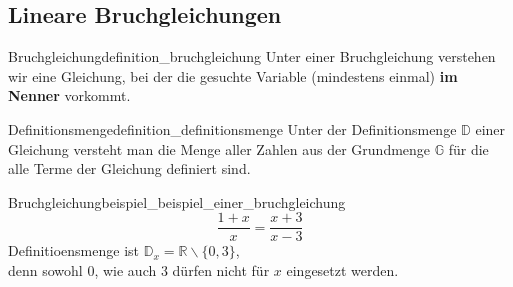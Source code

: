 
\subsection{Lineare Bruchgleichungen}






%

\begin{definition}{Bruchgleichung}{definition_bruchgleichung}
  Unter einer Bruchgleichung verstehen wir eine Gleichung, bei der die
  gesuchte Variable (mindestens einmal) \textbf{im Nenner} vorkommt.
\end{definition}
\vspace{.5cm}

\begin{definition}{Definitionsmenge}{definition_definitionsmenge}
  Unter der Definitionsmenge $\mathbb{D}$ einer Gleichung versteht man die Menge aller Zahlen aus der Grundmenge $\mathbb{G}$ für die alle Terme der Gleichung definiert sind.
\end{definition}
\vspace{.5cm}

\begin{beispiel}{Bruchgleichung}{beispiel_beispiel_einer_bruchgleichung}
$$\frac{1+x}{x}=\frac{x+3}{x-3}$$
\vspace{.5cm}
Definitioensmenge ist $\mathbb{D}_x = \mathbb{R}\backslash\{0, 3\}$,\\ denn sowohl $0$, wie auch $3$ dürfen nicht
  für $x$ eingesetzt werden.
\end{beispiel}
\vspace{.5cm}

